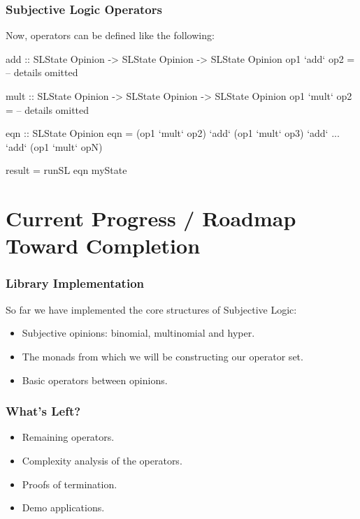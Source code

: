 \documentclass{beamer}
\begin{document}

\begin{frame}[fragile]
\frametitle{Subjective Logic Operators}

Now, operators can be defined like the following:

\begin{code}
add :: SLState Opinion -> SLState Opinion -> SLState Opinion
op1 `add` op2 = -- details omitted

mult :: SLState Opinion -> SLState Opinion -> SLState Opinion
op1 `mult` op2 = -- details omitted

eqn :: SLState Opinion
eqn = (op1 `mult` op2) `add` (op1 `mult` op3)
                       `add`
                       ...
                       `add` (op1 `mult` opN)

result = runSL eqn myState
\end{code}

\end{frame}

%
%

\section{Current Progress / Roadmap Toward Completion}

\begin{frame}
\frametitle{Library Implementation}

So far we have implemented the core structures of Subjective Logic:

\begin{itemize}
  \item Subjective opinions: binomial, multinomial and hyper.
  \item The monads from which we will be constructing our operator set.
  \item Basic operators between opinions.
\end{itemize}

\end{frame}


\begin{frame}
\frametitle{What's Left?}

\begin{itemize}
  \item Remaining operators.
  \item Complexity analysis of the operators.
  \item Proofs of termination.
  \item Demo applications.
\end{itemize}

\end{frame}
\end{document}

